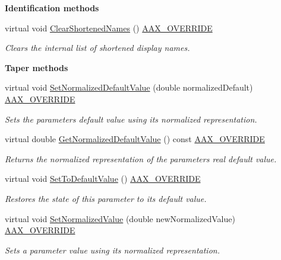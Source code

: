 \begin{Indent}{\bf Identification methods}
\begin{DoxyCompactItemize}
virtual void \hyperlink{a00033_aaf64cb6bcfb239dc3d60539bc84aca9d}{Clear\+Shortened\+Names} () \hyperlink{a00149_ac2f24a5172689ae684344abdcce55463}{A\+A\+X\+\_\+\+O\+V\+E\+R\+R\+I\+D\+E}
\begin{DoxyCompactList}\small\item\em Clears the internal list of shortened display names. \end{DoxyCompactList}\end{DoxyCompactItemize}
\end{Indent}
\begin{Indent}{\bf Taper methods}\par
\begin{DoxyCompactItemize}
\item 
virtual void \hyperlink{a00033_aa07573923547b6d2427ad394aac1ca8c}{Set\+Normalized\+Default\+Value} (double normalized\+Default) \hyperlink{a00149_ac2f24a5172689ae684344abdcce55463}{A\+A\+X\+\_\+\+O\+V\+E\+R\+R\+I\+D\+E}
\begin{DoxyCompactList}\small\item\em Sets the parameter\textquotesingle{}s default value using its normalized representation. \end{DoxyCompactList}\item 
virtual double \hyperlink{a00033_a9897b66c035ec5ae306f641728769abb}{Get\+Normalized\+Default\+Value} () const \hyperlink{a00149_ac2f24a5172689ae684344abdcce55463}{A\+A\+X\+\_\+\+O\+V\+E\+R\+R\+I\+D\+E}
\begin{DoxyCompactList}\small\item\em Returns the normalized representation of the parameter\textquotesingle{}s real default value. \end{DoxyCompactList}\item 
virtual void \hyperlink{a00033_a9ae87f0a8655c68ac7c59bec3f476c48}{Set\+To\+Default\+Value} () \hyperlink{a00149_ac2f24a5172689ae684344abdcce55463}{A\+A\+X\+\_\+\+O\+V\+E\+R\+R\+I\+D\+E}
\begin{DoxyCompactList}\small\item\em Restores the state of this parameter to its default value. \end{DoxyCompactList}\item 
virtual void \hyperlink{a00033_ac4f8ae8c5ecb2cd04ebc3aa2523449f7}{Set\+Normalized\+Value} (double new\+Normalized\+Value) \hyperlink{a00149_ac2f24a5172689ae684344abdcce55463}{A\+A\+X\+\_\+\+O\+V\+E\+R\+R\+I\+D\+E}
\begin{DoxyCompactList}\small\item\em Sets a parameter value using it\textquotesingle{}s normalized representation. \end{DoxyCompactList}\item 

\end{DoxyCompactItemize}
\end{Indent}
